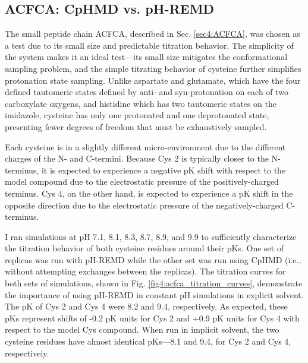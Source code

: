 \subsection{ACFCA: CpHMD vs. pH-REMD}

The small peptide chain ACFCA, described in Sec. \ref{sec4:ACFCA}, was chosen as a
test due to its small size and predictable titration behavior. The simplicity of
the system makes it an ideal test---its small size mitigates the conformational
sampling problem, and the simple titrating behavior of cysteine further
simplifies protonation state sampling. Unlike aspartate and glutamate, which
have the four defined tautomeric states defined by anti- and syn-protonation on
each of two carboxylate oxygens, and histidine which has two tautomeric states
on the imidazole, cysteine has only one protonated and one deprotonated state,
presenting fewer degrees of freedom that must be exhaustively sampled.

Each cysteine is in a slightly different micro-environment due to the different
charges of the N- and C-termini. Because Cys 2 is typically closer to the
N-terminus, it is expected to experience a negative pK shift with respect
to the model compound due to the electrostatic pressure of the
positively-charged terminus.  Cys 4, on the other hand, is expected to
experience a pK shift in the opposite direction due to the electrostatic
pressure of the negatively-charged C-terminus.

I ran simulations at pH 7.1, 8.1, 8.3, 8.7, 8.9, and 9.9 to sufficiently
characterize the titration behavior of both cysteine residues around their
pKs. One set of replicas was run with pH-REMD while the other set was run
using CpHMD (i.e., without attempting exchanges between the replicas). The
titration curves for both sets of simulations, shown in
Fig. \ref{fig4:acfca_titration_curves}, demonstrate the importance of using
pH-REMD in constant pH simulations in explicit solvent. The pK of Cys 2
and Cys 4 were 8.2 and 9.4, respectively. As expected, these pKs
represent shifts of -0.2 pK units for Cys 2 and +0.9 pK units for Cys 4 with
respect to the model Cys compound.  When run in implicit solvent, the two
cysteine residues have almost identical pKs---8.1 and 9.4, for Cys 2 and
Cys 4, respectively.

